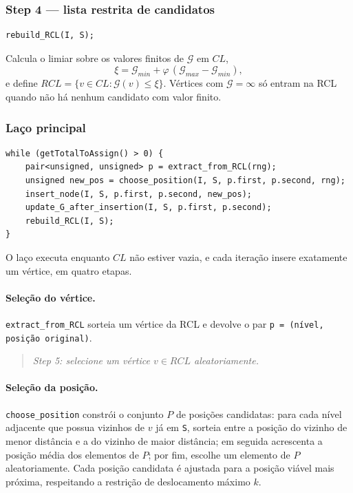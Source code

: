 \documentclass[12pt,a4paper]{article}
\newenvironment{artigo}
  {\begin{quote}\small\itshape}
  {\end{quote}}
\begin{document}
\subsubsection{Step 4 --- lista restrita de candidatos}

\begin{lstlisting}
rebuild_RCL(I, S);
\end{lstlisting}

Calcula o limiar sobre os valores finitos de $\mathcal{G}$ em $CL$,
\begin{equation}
\xi = \mathcal{G}_{min} + \varphi\,(\mathcal{G}_{max} - \mathcal{G}_{min}),
\label{eq:xi}
\end{equation}
e define $RCL = \{v \in CL : \mathcal{G}(v) \le \xi\}$. Vértices com
$\mathcal{G} = \infty$ só entram na RCL quando não há nenhum candidato
com valor finito.

\subsubsection{Laço principal}

\begin{lstlisting}
while (getTotalToAssign() > 0) {
    pair<unsigned, unsigned> p = extract_from_RCL(rng);
    unsigned new_pos = choose_position(I, S, p.first, p.second, rng);
    insert_node(I, S, p.first, p.second, new_pos);
    update_G_after_insertion(I, S, p.first, p.second);
    rebuild_RCL(I, S);
}
\end{lstlisting}

O laço executa enquanto $CL$ não estiver vazia, e cada iteração insere
exatamente um vértice, em quatro etapas.

\paragraph{Seleção do vértice.}
\texttt{extract\_from\_RCL} sorteia um vértice da RCL e devolve o par
\texttt{p = (nível, posição original)}.

\begin{artigo}
Step 5: selecione um vértice $v \in RCL$ aleatoriamente.
\end{artigo}

\paragraph{Seleção da posição.}
\texttt{choose\_position} constrói o conjunto $P$ de posições candidatas:
para cada nível adjacente que possua vizinhos de $v$ já em \texttt{S},
sorteia entre a posição do vizinho de menor distância e a do vizinho de
maior distância; em seguida acrescenta a posição média dos elementos de
$P$; por fim, escolhe um elemento de $P$ aleatoriamente. Cada posição
candidata é ajustada para a posição viável mais próxima, respeitando a
restrição de deslocamento máximo $k$.
\end{document}
